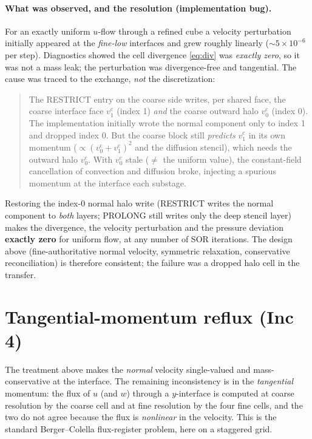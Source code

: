 \documentclass[11pt]{article}
\newcommand{\coarse}{\mathrm{c}}
\begin{document}
\paragraph{What was observed, and the resolution (implementation bug).}
For an exactly uniform $u$-flow through a refined cube a velocity perturbation
initially appeared at the \emph{fine-low} interfaces and grew roughly linearly
($\sim 5\times10^{-6}$ per step). Diagnostics showed the cell divergence
\eqref{eq:div} was \emph{exactly zero}, so it was not a mass leak; the
perturbation was divergence-free and tangential. The cause was traced to the
exchange, \emph{not} the discretization:
\begin{quote}
The RESTRICT entry on the coarse side writes, per shared face, the coarse
interface face $v^\coarse_1$ (index 1) \emph{and} the coarse outward halo
$v^\coarse_0$ (index 0). The implementation initially wrote the normal
component only to index 1 and dropped index 0. But the coarse block still
\emph{predicts} $v^\coarse_1$ in its own momentum
($\propto(v^\coarse_0{+}v^\coarse_1)^2$ and the diffusion stencil), which
needs the outward halo $v^\coarse_0$. With $v^\coarse_0$ stale ($\ne$ the
uniform value), the constant-field cancellation of convection and diffusion
broke, injecting a spurious momentum at the interface each substage.
\end{quote}
Restoring the index-0 normal halo write (RESTRICT writes the normal component
to \emph{both} layers; PROLONG still writes only the deep stencil layer)
makes the divergence, the velocity perturbation and the pressure deviation
\textbf{exactly zero} for uniform flow, at any number of SOR iterations. The
design above (fine-authoritative normal velocity, symmetric relaxation,
conservative reconciliation) is therefore consistent; the failure was a
dropped halo cell in the transfer.

\section{Tangential-momentum reflux (Inc 4)}

The treatment above makes the \emph{normal} velocity single-valued and
mass-conservative at the interface. The remaining inconsistency is in the
\emph{tangential} momentum: the flux of $u$ (and $w$) through a $y$-interface
is computed at coarse resolution by the coarse cell and at fine resolution by
the four fine cells, and the two do not agree because the flux is
\emph{nonlinear} in the velocity. This is the standard Berger--Colella
flux-register problem, here on a staggered grid.
\end{document}

